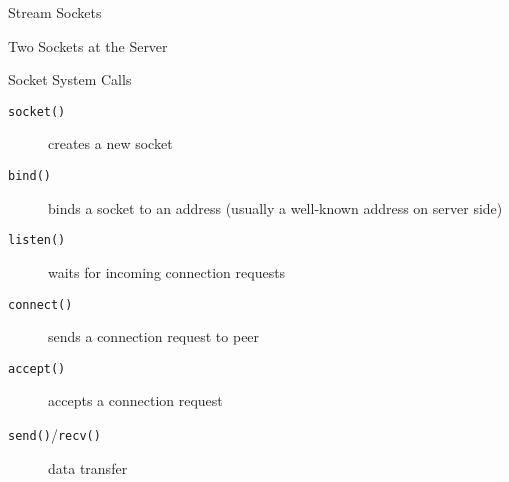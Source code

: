 \begin{frame}{Stream Sockets}
  \centering
  \mode<beamer>{ \texttt{[image: socket-stream]} }%
\end{frame}

\begin{frame}{Two Sockets at the Server}
  \centering
  \mode<beamer>{ \texttt{[image: tcpsocket]} }%
\end{frame}

\begin{frame}{Socket System Calls}
  \begin{description}
  \item[\texttt{socket()}] creates a new socket
  \item[\texttt{bind()}] binds a socket to an address (usually a well-known address on
    server side)
  \item[\texttt{listen()}] waits for incoming connection requests
  \item[\texttt{connect()}] sends a connection request to peer
  \item[\texttt{accept()}] accepts a connection request
  \item[\texttt{send()}/\texttt{recv()}] data transfer
  \end{description}
\end{frame}

